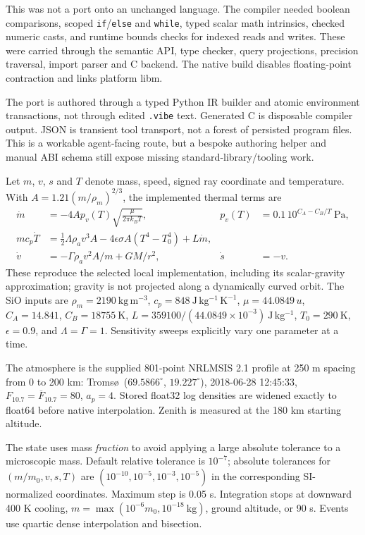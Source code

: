\documentclass[10pt]{article}
\begin{document}

This was not a port onto an unchanged language. The compiler needed boolean
comparisons, scoped \texttt{if}/\texttt{else} and \texttt{while}, typed scalar
math intrinsics, checked numeric casts, and runtime bounds checks for indexed
reads and writes. These were carried through the semantic API, type checker,
query projections, precision traversal, import parser and C backend. The native
build disables floating-point contraction and links platform libm.

The port is authored through a typed Python IR builder and atomic environment
transactions, not through edited \texttt{.vibe} text. Generated C is disposable
compiler output. JSON is transient tool transport, not a forest of persisted
program files. This is a workable agent-facing route, but a bespoke authoring
helper and manual ABI schema still expose missing standard-library/tooling work.

\newpage
{}

Let $m$, $v$, $s$ and $T$ denote mass, speed, signed ray coordinate and
temperature. With $A=1.21(m/\rho_m)^{2/3}$, the implemented thermal terms are
\begin{align}
 \dot m &=-4A p_v(T)\sqrt{\frac{\mu}{2\pi k_B T}},
 &p_v(T)&=0.1\,10^{C_A-C_B/T}\ \mathrm{Pa},\\
 mc_p\dot T&=\tfrac12\Lambda\rho_a v^3 A
 -4\epsilon\sigma A(T^4-T_0^4)+L\dot m,\\
 \dot v&=-\Gamma\rho_a v^2 A/m+GM/r^2,
 &\dot s&=-v.
\end{align}
These reproduce the selected local implementation, including its scalar-gravity
approximation; gravity is not projected along a dynamically curved orbit.
The SiO inputs are $\rho_m=2190\ \mathrm{kg\,m^{-3}}$,
$c_p=848\ \mathrm{J\,kg^{-1}\,K^{-1}}$, $\mu=44.0849\,u$,
$C_A=14.841$, $C_B=18755\ \mathrm K$,
$L=359100/(44.0849\times10^{-3})\ \mathrm{J\,kg^{-1}}$,
$T_0=290\ \mathrm K$, $\epsilon=0.9$, and $\Lambda=\Gamma=1$.
Sensitivity sweeps explicitly vary one parameter at a time.

The atmosphere is the supplied 801-point NRLMSIS 2.1 profile at 250 m spacing
from 0 to 200 km: Troms\o\ ($69.5866^\circ$, $19.227^\circ$),
2018-06-28 12:45:33, $F_{10.7}=\overline F_{10.7}=80$, $a_p=4$.
Stored float32 log densities are widened exactly to float64 before native
interpolation. Zenith is measured at the 180 km starting altitude.

The state uses mass \emph{fraction} to avoid applying a large absolute tolerance
to a microscopic mass. Default relative tolerance is $10^{-7}$; absolute
tolerances for $(m/m_0,v,s,T)$ are $(10^{-10},10^{-5},10^{-3},10^{-5})$ in
the corresponding SI-normalized coordinates. Maximum step is 0.05 s.
Integration stops at downward 400 K cooling, $m=\max(10^{-6}m_0,10^{-18}\ \mathrm{kg})$,
ground altitude, or 90 s. Events use quartic dense interpolation and bisection.
\end{document}
